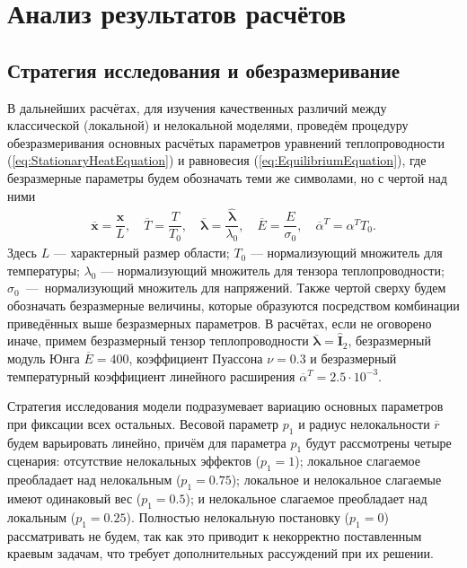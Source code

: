 \chapter{Анализ результатов расчётов}\label{ch:ResultsAnalysis} 

\section{Стратегия исследования и обезразмеривание}\label{sec:ResultsAnalysis/Strategy}

В дальнейших расчётах, для изучения качественных различий между классической (локальной) и нелокальной моделями, проведём процедуру обезразмеривания основных расчётых параметров уравнений теплопроводности (\ref{eq:StationaryHeatEquation}) и равновесия (\ref{eq:EquilibriumEquation}), где безразмерные параметры будем обозначать теми же символами, но с чертой над ними
\begin{gather*}
	\overline{\boldsymbol{x}} = \dfrac{\boldsymbol{x}}{L},
	\quad
	\overline{T} = \dfrac{T}{T_0},
	\quad
	\overline{\boldsymbol{\lambda}} = \dfrac{\widehat{\boldsymbol{\lambda}}}{\lambda_0},
	\quad
	\overline{E} = \dfrac{E}{\sigma_0},
	\quad
	\overline{\alpha}^T = \alpha^T T_0.
\end{gather*}
Здесь $L$ --- характерный размер области; $T_0$ --- нормализующий множитель для температуры; $\lambda_0$ --- нормализующий множитель для тензора теплопроводности; $\sigma_0$~---~нормализующий множитель для напряжений. Также чертой сверху будем обозначать безразмерные величины, которые образуются посредством комбинации приведённых выше безразмерных параметров. В расчётах, если не оговорено иначе, примем безразмерный тензор теплопроводности $\overline{\boldsymbol{\lambda}} = \widehat{\textbf{I}}_2$, безразмерный модуль Юнга $\overline{E} = 400$, коэффициент Пуассона $\nu = 0.3$ и безразмерный температурный коэффициент линейного расширения $\overline{\alpha}^T = 2.5 \cdot 10^{-3}$.

Стратегия исследования модели подразумевает вариацию основных параметров при фиксации всех остальных. Весовой параметр $p_1$ и радиус нелокальности $\overline{r}$ будем варьировать линейно, причём для параметра $p_1$ будут рассмотрены четыре сценария: отсутствие нелокальных эффектов ($p_1 = 1$); локальное слагаемое преобладает над нелокальным ($p_1 = 0.75$); локальное и нелокальное слагаемые имеют одинаковый вес ($p_1 = 0.5$); и нелокальное слагаемое преобладает над локальным ($p_1 = 0.25$). Полностью нелокальную постановку ($p_1 = 0$) рассматривать не будем, так как это приводит к некорректно поставленным краевым задачам, что требует дополнительных рассуждений при их решении.

